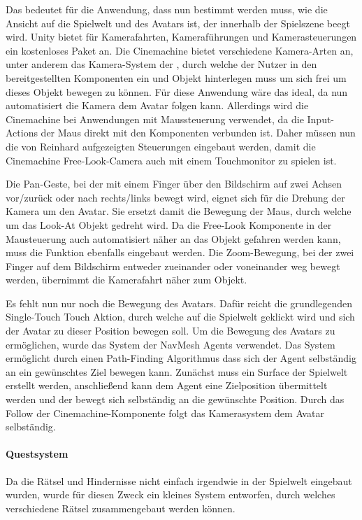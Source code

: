Das bedeutet für die Anwendung, dass nun bestimmt werden muss, wie die Ansicht auf die Spielwelt und des Avatars ist, der innerhalb der Spielszene beegt wird. Unity bietet für Kamerafahrten, Kameraführungen und Kamerasteuerungen ein kostenloses Paket an. Die Cinemachine bietet verschiedene Kamera-Arten an, unter anderem das Kamera-System der , durch welche der Nutzer in den bereitgestellten Komponenten ein  und  Objekt hinterlegen muss um sich frei um dieses Objekt bewegen zu können. Für diese Anwendung wäre das ideal, da nun automatisiert die Kamera dem Avatar folgen kann. Allerdings wird die Cinemachine bei Anwendungen mit Maussteuerung verwendet, da die Input-Actions der Maus direkt mit den Komponenten verbunden ist. Daher müssen nun die von Reinhard aufgezeigten Steuerungen eingebaut werden, damit die Cinemachine Free-Look-Camera auch mit einem Touchmonitor zu spielen ist. 

Die Pan-Geste, bei der mit einem Finger über den Bildschirm auf zwei Achsen vor/zurück oder nach rechts/links bewegt wird, eignet sich für die Drehung der Kamera um den Avatar. Sie ersetzt damit die Bewegung der Maus, durch welche um das Look-At Objekt gedreht wird. Da die Free-Look Komponente in der Mausteuerung auch automatisiert näher an das Objekt gefahren werden kann, muss die Funktion ebenfalls eingebaut werden. Die Zoom-Bewegung, bei der zwei Finger auf dem Bildschirm entweder zueinander oder voneinander weg bewegt werden, übernimmt die Kamerafahrt näher zum Objekt.

Es fehlt nun nur noch die Bewegung des Avatars. Dafür reicht die grundlegenden Single-Touch Touch Aktion, durch welche auf die Spielwelt geklickt wird und sich der Avatar zu dieser Position bewegen soll. Um die Bewegung des Avatars zu ermöglichen, wurde das System der NavMesh Agents verwendet. Das System ermöglicht durch einen Path-Finding Algorithmus dass sich der Agent selbständig an ein gewünschtes Ziel bewegen kann. Zunächst muss ein Surface der Spielwelt erstellt werden, anschließend kann dem Agent eine Zielposition übermittelt werden und der bewegt sich selbständig an die gewünschte Position. Durch das Follow der Cinemachine-Komponente folgt das Kamerasystem dem Avatar selbständig.

\paragraph{Questsystem}
Da die Rätsel und Hindernisse nicht einfach irgendwie in der Spielwelt eingebaut wurden, wurde für diesen Zweck ein kleines System entworfen, durch welches verschiedene Rätsel zusammengebaut werden können.

